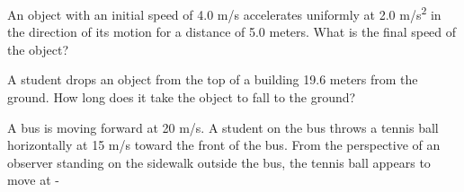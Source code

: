\documentclass[10pt]{examdesign}
\begin{document}
\begin{multiplechoice} [title={Multiple Choice},
	rearrange=no]






%
%




\begin{question}
An object with an initial speed of 4.0 m/s accelerates uniformly at 2.0 m/s\textsuperscript{2} in the direction of its motion for a distance of 5.0 meters. What is the
final speed of the object? 
	\end{question}

\begin{question}
A student drops an object from the top of a building 19.6 meters from the ground. How long does it take the object to fall to the ground? 
\end{question}

\begin{question}
A bus is moving forward at 20 m/s.  A student on the bus throws a tennis ball horizontally at 15 m/s toward the front of the bus.  From the perspective of an observer standing on the sidewalk outside the bus, the tennis ball appears to move at - 
	\end{question}


\end{multiplechoice}
\end{document}
